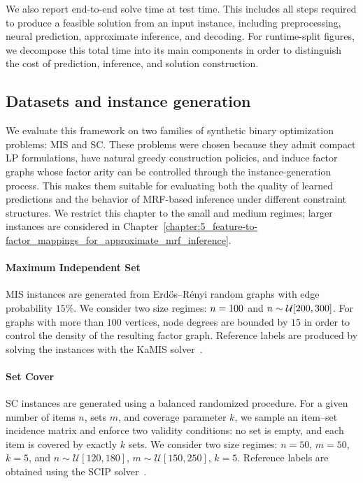 We also report end-to-end solve time at test time. This includes all steps required to produce a feasible solution from an input instance, including preprocessing, neural prediction, approximate inference, and decoding. For runtime-split figures, we decompose this total time into its main components in order to distinguish the cost of prediction, inference, and solution construction.

\subsection{Datasets and instance generation}
\label{sec:datasets}

We evaluate this framework on two families of synthetic binary optimization problems: MIS and SC. These problems were chosen because they admit compact LP formulations, have natural greedy construction policies, and induce factor graphs whose factor arity can be controlled through the instance-generation process. This makes them suitable for evaluating both the quality of learned predictions and the behavior of MRF-based inference
under different constraint structures. We restrict this chapter to the small and medium regimes; larger instances
are considered in Chapter~\ref{chapter:5_feature-to-factor_mappings_for_approximate_mrf_inference}.

\paragraph{Maximum Independent Set}
MIS instances are generated from Erdős--Rényi random graphs with edge probability $15\%$. We consider two size regimes: $n = 100$ and $n \sim \mathcal{U}[200,300]$. For graphs with more than $100$ vertices, node degrees are bounded by $15$ in order to control the density of the resulting factor graph. Reference labels are produced by solving the instances with the KaMIS solver~\citep{lamm_finding_2017}.

\paragraph{Set Cover}
SC instances are generated using a balanced randomized procedure. For a given number of items $n$, sets $m$, and coverage parameter $k$, we sample an item--set incidence matrix and enforce two validity conditions: no set is empty, and each item is covered by exactly $k$ sets. We consider two size regimes: $n=50$, $m=50$, $k=5$, and $n \sim \mathcal{U}[120,180]$, $m \sim \mathcal{U}[150,250]$, $k=5$. Reference labels are obtained using the SCIP solver~\citep{achterberg_scip_2009}.


